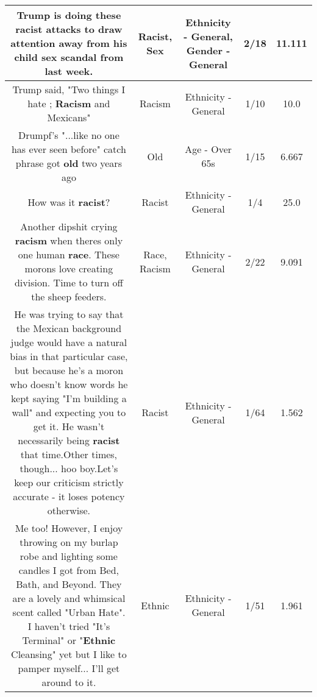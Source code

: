 \documentclass[11pt]{article}
\newlength\mylength
\begin{document}
\begin{center}
\begin{longtable}{|C{.65\mylength}|C{.30\mylength}|C{.12\mylength}|C{.12\mylength}|C{.12\mylength}|}
  \small Trump is doing these \textbf{racist} attacks to draw attention away from his child \textbf{sex} scandal from last week.\normalsize   & Racist, Sex & Ethnicity - General, Gender - General & 2/18 & 11.111 \\  \hline
  \small Trump said, "Two things I hate ; \textbf{Racism} and Mexicans"\normalsize   & Racism & Ethnicity - General & 1/10 & 10.0 \\  \hline
  \small Drumpf's "...like no one has ever seen before" catch phrase got \textbf{old} two years ago\normalsize   & Old & Age - Over 65s & 1/15 & 6.667 \\  \hline
  \small How was it \textbf{racist}?\normalsize   & Racist & Ethnicity - General & 1/4 & 25.0 \\  \hline
  \small Another dipshit crying \textbf{racism} when theres only one human \textbf{race}.  These morons love creating division. Time to turn off the sheep  feeders.\normalsize   & Race, Racism & Ethnicity - General & 2/22 & 9.091 \\  \hline
  \small He was trying to say that the Mexican background judge would have a natural bias in that particular case, but because he's a moron who doesn't know words he kept saying "I'm building a wall" and expecting you to get it. He wasn't necessarily being \textbf{racist} that time.Other times, though... hoo boy.Let's keep our criticism strictly accurate - it loses potency otherwise.\normalsize   & Racist & Ethnicity - General & 1/64 & 1.562 \\  \hline
  \small Me too! However, I enjoy throwing on my burlap robe and lighting some candles I got from Bed, Bath, and Beyond. They are a lovely and whimsical scent called "Urban Hate".  I haven't tried "It's Terminal" or "\textbf{Ethnic} Cleansing" yet but I like to pamper myself... I'll get around to it.\normalsize   & Ethnic & Ethnicity - General & 1/51 & 1.961 \\  \hline

\end{longtable}
\end{center}
\end{document}

